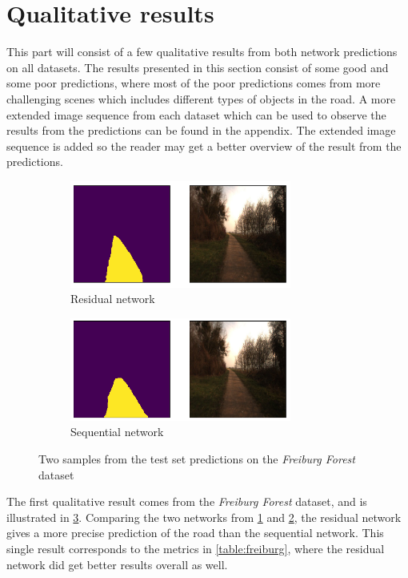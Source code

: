 \documentclass[USenglish]{ifimaster}  %
\begin{document}
\section{Qualitative results}
This part will consist of a few qualitative results from both network predictions on all datasets. The results presented in this section consist of some good and some poor predictions, where most of the poor predictions comes from more challenging scenes which includes different types of objects in the road. A more extended image sequence from each dataset which can be used to observe the results from the predictions can be found in the appendix. The extended image sequence is added so the reader may get a better overview of the result from the predictions.

\begin{figure}[ht]
\centering
\begin{subfigure}[b]{\textwidth}
\centering
\includegraphics[width=0.8\textwidth]{bilder/freiburg/b57-8406_Clipped_res.png}
\caption{Residual network}
\label{fig:ff_res}
\end{subfigure}
\hfill
\begin{subfigure}[b]{\textwidth}
\centering
\includegraphics[width=0.8\textwidth]{bilder/freiburg/b57-8406_Clipped_seq.png}
\caption{Sequential network}
\label{fig:ff_seq}
\end{subfigure}
\caption{Two samples from the test set predictions on the
\textit{Freiburg Forest} dataset}
\label{fig:ff_result}
\end{figure}
The first qualitative result comes from the \textit{Freiburg Forest} dataset, and is illustrated in \cref{fig:ff_result}. Comparing the two networks from \cref{fig:ff_res} and \cref{fig:ff_seq}, the residual network gives a more precise prediction of the road than the sequential network. This single result corresponds to the metrics in \cref{table:freiburg}, where the residual network did get better results overall as well. 
\end{document}
